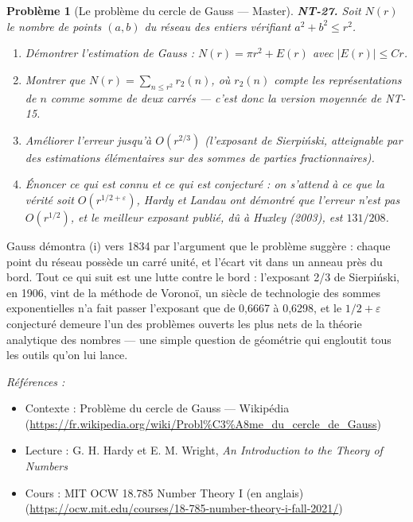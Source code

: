 \documentclass[11pt]{article}
\newtheorem{problem}{Problème}
\newenvironment{refs}{\par\small\noindent\emph{Références :}\begin{itemize}\setlength\itemsep{0pt}}{\end{itemize}\normalsize}
\begin{document}
\begin{problem}[{Le problème du cercle de Gauss --- Master}]
\textbf{NT-27.} Soit $N(r)$ le nombre de points $(a, b)$ du
réseau des entiers vérifiant $a^2 + b^2 \le r^2$.
\begin{enumerate}
\item[(i)] Démontrer l'estimation de Gauss :
$N(r) = \pi r^2 + E(r)$ avec $|E(r)| \le C r$.
\item[(ii)] Montrer que
$N(r) = \sum_{n \le r^2} r_2(n)$, où $r_2(n)$ compte les représentations de $n$ comme
somme de deux carrés --- c'est donc la version \textit{moyennée} de NT-15.
\item[(iii)] Améliorer
l'erreur jusqu'à $O(r^{2/3})$ (l'exposant de Sierpi\'nski, atteignable par des estimations
élémentaires sur des sommes de parties fractionnaires).
\item[(iv)] Énoncer ce qui est connu et ce qui est conjecturé : on s'attend à ce que la vérité soit
$O(r^{1/2 + \varepsilon})$, Hardy et Landau ont démontré que l'erreur n'est \textit{pas}
$O(r^{1/2})$, et le meilleur exposant publié, dû à Huxley (2003), est
$131/208$.
\end{enumerate}

\end{problem}

\noindent Gauss démontra (i) vers 1834 par l'argument que le problème suggère :
chaque point du réseau possède un carré unité, et l'écart vit dans un anneau près du
bord. Tout ce qui suit est une lutte contre le bord : l'exposant 2/3 de Sierpi\'nski, en 1906, vint de
la méthode de Voronoï, un siècle de technologie des sommes exponentielles n'a fait passer l'exposant
que de 0,6667 à 0,6298, et le $1/2 + \varepsilon$ conjecturé demeure l'un des problèmes ouverts les
plus nets de la théorie analytique des nombres --- une simple question de géométrie qui engloutit tous
les outils qu'on lui lance.

\begin{refs}
\item Contexte : Problème du cercle de Gauss --- Wikipédia (\url{https://fr.wikipedia.org/wiki/Probl%C3%A8me_du_cercle_de_Gauss})
\item Lecture : G. H. Hardy et E. M. Wright, \textit{An Introduction to the Theory of Numbers}
\item Cours : MIT OCW 18.785 Number Theory I (en anglais) (\url{https://ocw.mit.edu/courses/18-785-number-theory-i-fall-2021/})
\end{refs}

\bigskip
\end{document}
